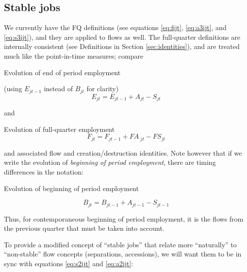 

\subsection{Stable jobs}

We currently have the FQ definitions (see equations \ref{eq:fijt},
\ref{eq:a3ijt}, and \ref{eq:s3ijt}), and they are applied to flows as
well. The full-quarter definitions are internally consistent (see
Definitions in Section \ref{sec:identities}), and are
treated much like the point-in-time measures; compare

\begin{definition}
Evolution of end of period employment 

(using $E_{jt - 1}$ instead of
$B_{jt}$ for clarity)
\begin{equation*}
E_{jt} = E_{jt - 1} + A_{jt} - S_{jt}
\end{equation*}
\end{definition}

and

\begin{definition}
Evolution of full-quarter employment 
\begin{equation*}
F_{jt} = F_{jt - 1} + FA{\ }_{jt} - FS_{jt}
\end{equation*}
\end{definition}

and associated flow and creation/destruction identities. Note however that
if we write the evolution of {\it beginning of period employment}, there are
timing differences in the notation:

\begin{definition}
Evolution of beginning of period employment 

\begin{equation*}
B_{jt} = B_{jt - 1} + A_{jt-1} - S_{jt-1}
\end{equation*}
\end{definition}

Thus, for contemporaneous beginning of period employment, it is the flows
from the previous quarter that must be taken into account.

To provide a modified concept of ``stable jobs'' that relate more
``naturally'' to ``non-stable'' flow concepts (separations, accessions), we
will want them to be in sync with equations \ref{eq:s2ijt} and
\ref{eq:a2ijt}:

